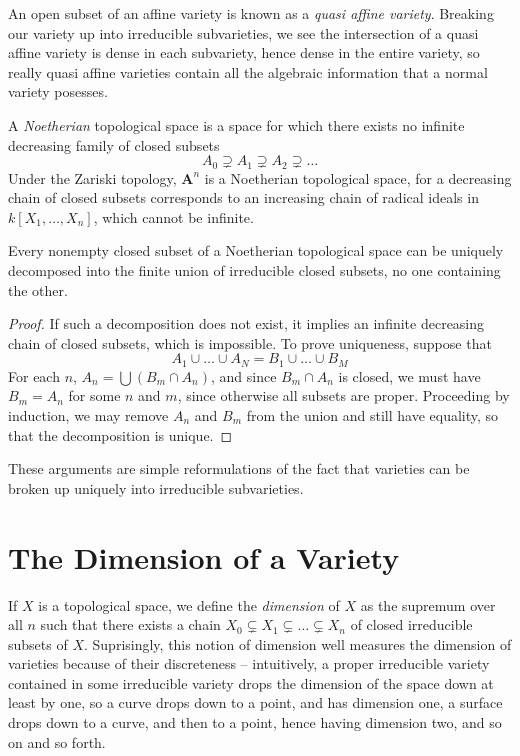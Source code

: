 An open subset of an affine variety is known as a \emph{quasi affine variety}. Breaking our variety up into irreducible subvarieties, we see the intersection of a quasi affine variety is dense in each subvariety, hence dense in the entire variety, so really quasi affine varieties contain all the algebraic information that a normal variety posesses.

A \emph{Noetherian} topological space is a space for which there exists no infinite decreasing family of closed subsets
%
\[ A_0 \supsetneq A_1 \supsetneq A_2 \supsetneq \dots \]
%
Under the Zariski topology, $\mathbf{A}^n$ is a Noetherian topological space, for a decreasing chain of closed subsets corresponds to an increasing chain of radical ideals in $k[X_1,\dots,X_n]$, which cannot be infinite.

\begin{theorem}
    Every nonempty closed subset of a Noetherian topological space can be uniquely decomposed into the finite union of irreducible closed subsets, no one containing the other.
\end{theorem}
\begin{proof}
    If such a decomposition does not exist, it implies an infinite decreasing chain of closed subsets, which is impossible. To prove uniqueness, suppose that
    \[ A_1 \cup \dots \cup A_N = B_1 \cup \dots \cup B_M \]
    For each $n$, $A_n = \bigcup (B_m \cap A_n)$, and since $B_m \cap A_n$ is closed, we must have $B_m = A_n$ for some $n$ and $m$, since otherwise all subsets are proper. Proceeding by induction, we may remove $A_n$ and $B_m$ from the union and still have equality, so that the decomposition is unique.
\end{proof}

These arguments are simple reformulations of the fact that varieties can be broken up uniquely into irreducible subvarieties.

\section{The Dimension of a Variety}

If $X$ is a topological space, we define the \emph{dimension} of $X$ as the supremum over all $n$ such that there exists a chain $X_0 \subsetneq X_1 \subsetneq \dots \subsetneq X_n$ of closed irreducible subsets of $X$. Suprisingly, this notion of dimension well measures the dimension of varieties because of their discreteness -- intuitively, a proper irreducible variety contained in some irreducible variety drops the dimension of the space down at least by one, so a curve drops down to a point, and has dimension one, a surface drops down to a curve, and then to a point, hence having dimension two, and so on and so forth.

